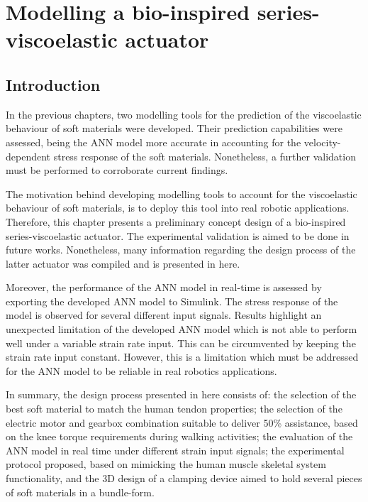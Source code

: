 \chapter{Modelling a bio-inspired series-viscoelastic actuator} \label{ch7:ModelingBio}

\section{Introduction}

In the previous chapters, two modelling tools for the prediction of the viscoelastic behaviour of soft materials were developed. Their prediction capabilities were assessed, being the ANN model more accurate in accounting for the velocity-dependent stress response of the soft materials. Nonetheless, a further validation must be performed to corroborate current findings. 

The motivation behind developing modelling tools to account for the viscoelastic behaviour of soft materials, is to deploy this tool into real robotic applications. Therefore, this chapter presents a preliminary concept design of a bio-inspired series-viscoelastic actuator. The experimental validation is aimed to be done in future works. Nonetheless, many information regarding the design process of the latter actuator was compiled and is presented in here.

Moreover, the performance of the ANN model in real-time is assessed by exporting the developed ANN model to Simulink. The stress response of the model is observed for several different input signals. Results highlight an unexpected limitation of the developed ANN model which is not able to perform well under a variable strain rate input. This can be circumvented by keeping the strain rate input constant. However, this is a limitation which must be addressed for the ANN model to be reliable in real robotics applications.

In summary, the design process presented in here consists of: the selection of the best soft material to match the human tendon properties; the selection of the electric motor and gearbox combination suitable to deliver 50\% assistance, based on the knee torque requirements during walking activities; the evaluation of the ANN model in real time under different strain input signals; the experimental protocol proposed, based on mimicking the human muscle skeletal system functionality, and the 3D design of a clamping device aimed to hold several pieces of soft materials in a bundle-form.

